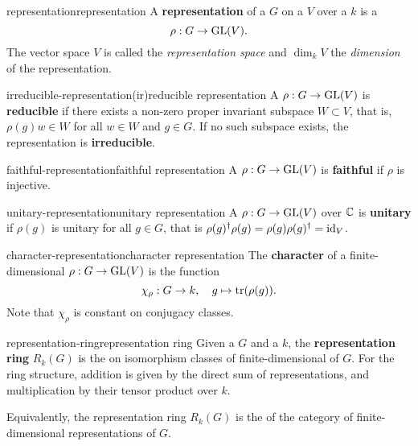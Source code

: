 \begin{topic}{representation}{representation}
    A \textbf{representation} of a  $G$ on a  $V$ over a  $k$ is a 
    \[ \rho : G \to \textup{GL}(V) . \]
    The vector space $V$ is called the \textit{representation space} and $\dim_k V$ the \textit{dimension} of the representation.
\end{topic}

\begin{topic}{irreducible-representation}{(ir)reducible representation}
    A  $\rho : G \to \textup{GL}(V)$ is \textbf{reducible} if there exists a non-zero proper invariant subspace $W \subset V$, that is, $\rho(g) w \in W$ for all $w \in W$ and $g \in G$. If no such subspace exists, the representation is \textbf{irreducible}. %
\end{topic}

\begin{topic}{faithful-representation}{faithful representation}
    A  $\rho : G \to \textup{GL}(V)$ is \textbf{faithful} if $\rho$ is injective.
\end{topic}

\begin{topic}{unitary-representation}{unitary representation}
    A  $\rho : G \to \textup{GL}(V)$ over $\mathbb{C}$ is \textbf{unitary} if $\rho(g)$ is unitary for all $g \in G$, that is $\rho(g)^\dagger \rho(g) = \rho(g) \rho(g)^\dagger = \textup{id}_V$.
\end{topic}

\begin{topic}{character-representation}{character representation}
    The \textbf{character} of a finite-dimensional  $\rho : G \to \textup{GL}(V)$ is the function
    \[ \chi_\rho : G \to k, \quad g \mapsto \textup{tr}(\rho(g)) . \]
    Note that $\chi_\rho$ is constant on conjugacy classes.
\end{topic}

\begin{topic}{representation-ring}{representation ring}
    Given a  $G$ and a  $k$, the \textbf{representation ring} $R_k(G)$ is the  on isomorphism classes of finite-dimensional  of $G$. For the ring structure, addition is given by the direct sum of representations, and multiplication by their tensor product over $k$.
    
    Equivalently, the representation ring $R_k(G)$ is the  of the category of finite-dimensional representations of $G$.
\end{topic}

